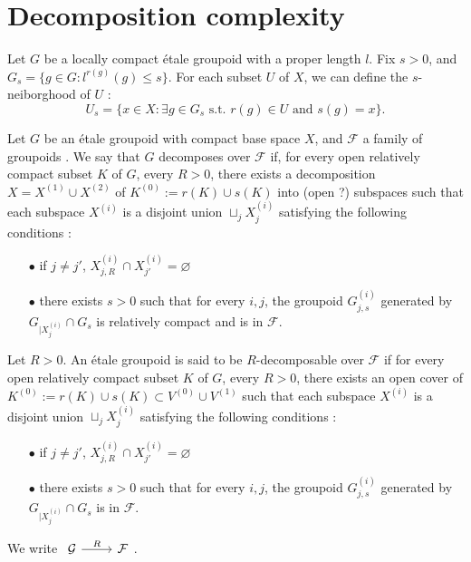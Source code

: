 \section{Decomposition complexity}

Let $G$ be a locally compact étale groupoid with a proper length $l$. Fix $s>0$, and $G_s=\{g\in G : l^{r(g)}(g)\leq s\}$. For each subset $U$ of $X$, we can define the $s$-neiborghood of $U$ :
\[U_s = \{x\in X : \exists g\in G_s \text{ s.t. } r(g)\in U \text{ and } s(g)=x \}.\]

\begin{definition}
Let $G$ be an étale groupoid with compact base space $X$, and $\mathcal F$ a family of groupoids . We say that $G$ decomposes over $\mathcal F$ if, for every open relatively compact subset $K$ of $G$, every $R>0$, there exists a decomposition $X=X^{(1)}\cup X^{(2)}$ of $K^{(0)}:= r(K)\cup s(K)$ into (open ?) subspaces such that each subspace $X^{(i)}$ is a disjoint union $\sqcup_j X^{(i)}_j$ satisfying the following conditions :
\begin{itemize}
\item[$\bullet$] if $j\neq j'$,  $X^{(i)}_{j,R}\cap X^{(i)}_{j'}=\varnothing$
\item[$\bullet$] there exists $s>0$ such that for every $i,j$, the groupoid $G_{j,s}^{(i)}$ generated by $G_{|X^{(i)}_j}\cap G_s$ is relatively compact and is in $\mathcal F$.
\end{itemize}
\end{definition}

\begin{definition}
Let $R>0$. An étale groupoid is said to be $R$-decomposable over $\mathcal F$ if for every open relatively compact subset $K$ of $G$, every $R>0$, there exists an open cover of $K^{(0)}:= r(K)\cup s(K)\subset V^{(0)}\cup V^{(1)}$ such that each subspace $X^{(i)}$ is a disjoint union $\sqcup_j X^{(i)}_j$ satisfying the following conditions :
\begin{itemize}
\item[$\bullet$] if $j\neq j'$,  $X^{(i)}_{j,R}\cap X^{(i)}_{j'}=\varnothing$
\item[$\bullet$] there exists $s>0$ such that for every $i,j$, the groupoid $G_{j,s}^{(i)}$ generated by $G_{|X^{(i)}_j}\cap G_s$ is in $\mathcal F$.
\end{itemize}
We write $\begin{tikzcd}\mathcal G \arrow{r}{R} & \mathcal F\end{tikzcd}$.
\end{definition}

